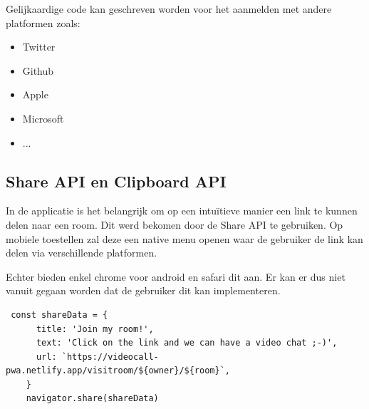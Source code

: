 		Gelijkaardige code kan geschreven worden voor het aanmelden met andere platformen zoals:
		\begin{itemize}
			\item Twitter
			\item Github
			\item Apple
			\item Microsoft
			\item ...
		\end{itemize} 
		
	\subsection{Share API en Clipboard API}
	
		In de applicatie is het belangrijk om op een intuïtieve manier een link te kunnen delen naar een room. 
		Dit werd bekomen door de Share API te gebruiken.
		Op mobiele toestellen zal deze een native menu openen waar de gebruiker de link kan delen via verschillende platformen.
		
		Echter bieden enkel chrome voor android en safari dit aan. Er kan er dus niet vanuit gegaan worden dat de gebruiker dit kan implementeren.

\begin{lstlisting}
 const shareData = {
      title: 'Join my room!',
      text: 'Click on the link and we can have a video chat ;-)',
      url: `https://videocall-pwa.netlify.app/visitroom/${owner}/${room}`,
    }
    navigator.share(shareData)
\end{lstlisting}

